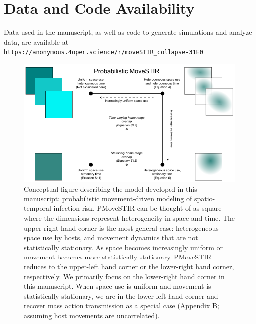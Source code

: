 ﻿\documentclass[11pt]{article}
\begin{document}


\section*{Data and Code Availability}

Data used in the manuscript, as well as code to generate simulations and analyze data, are available at \texttt{https://anonymous.4open.science/r/moveSTIR\_collapse-31E0}





\begin{figure}
    \includegraphics[width=\textwidth]{figures/conceptual_figure_pmovestir_mod.pdf}
    \caption{Conceptual figure describing the model developed in this manuscript: probabilistic movement-driven modeling of spatio-temporal infection risk. PMoveSTIR can be thought of as square where the dimensions represent heterogeneity in space and time. The upper right-hand corner is the most general case: heterogeneous space use by hosts, and movement dynamics that are not statistically stationary.  As space becomes increasingly uniform or movement becomes more statistically stationary, PMoveSTIR reduces to the upper-left hand corner or the lower-right hand corner, respectively.  We primarily focus on the lower-right hand corner in this manuscript.  When space use is uniform and movement is statistically stationary, we are in the lower-left hand corner and recover mass action transmission as a special case (Appendix B; assuming host movements are uncorrelated).}
  \label{fig:square}
\end{figure}
\end{document}
